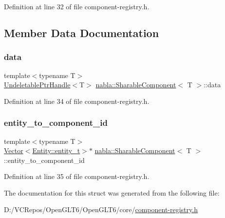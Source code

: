 Definition at line 32 of file component-\/registry.\+h.



\subsection{Member Data Documentation}
\mbox{\label{structnabla_1_1_sharable_component_a00e7dee9a30a4e54c137748b8ea7f74b}} 
\subsubsection{\texorpdfstring{data}{data}}
{\footnotesize\ttfamily template$<$typename T$>$ \\
\mbox{\hyperlink{structnabla_1_1_undeletable_ptr_handle}{Undeletable\+Ptr\+Handle}}$<$T$>$ \mbox{\hyperlink{structnabla_1_1_sharable_component}{nabla\+::\+Sharable\+Component}}$<$ T $>$\+::data}



Definition at line 34 of file component-\/registry.\+h.

\mbox{\label{structnabla_1_1_sharable_component_abdce182855122da5fdd3ad93692a9adf}} 
\subsubsection{\texorpdfstring{entity\_to\_component\_id}{entity\_to\_component\_id}}
{\footnotesize\ttfamily template$<$typename T$>$ \\
\mbox{\hyperlink{namespacenabla_a34f7ca8c9af290f9af3ed299236ff959}{Vector}}$<$\mbox{\hyperlink{structnabla_1_1_entity_a0e7d5826cda759dfeb3a81c8175f3b4d}{Entity\+::entity\+\_\+t}}$>$$\ast$ \mbox{\hyperlink{structnabla_1_1_sharable_component}{nabla\+::\+Sharable\+Component}}$<$ T $>$\+::entity\+\_\+to\+\_\+component\+\_\+id}



Definition at line 35 of file component-\/registry.\+h.



The documentation for this struct was generated from the following file\+:\begin{DoxyCompactItemize}
\item 
D\+:/\+V\+C\+Repos/\+Open\+G\+L\+T6/\+Open\+G\+L\+T6/core/\mbox{\hyperlink{component-registry_8h}{component-\/registry.\+h}}\end{DoxyCompactItemize}
